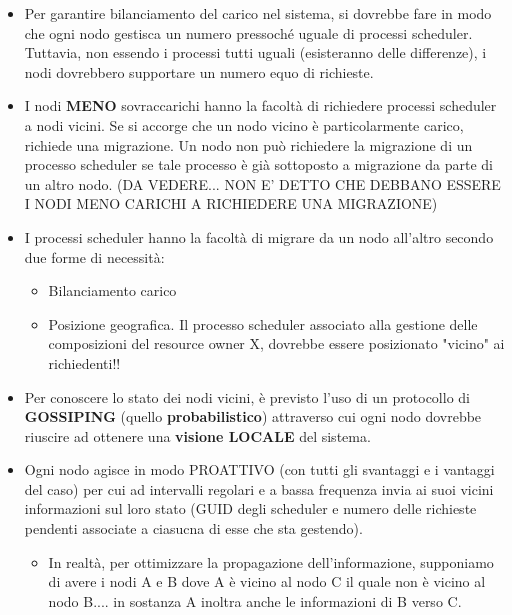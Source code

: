 \documentclass[10pt,a4paper]{report}
\begin{document}
\begin{itemize}
\item Per garantire bilanciamento del carico nel sistema, si dovrebbe fare in modo che ogni nodo gestisca un numero pressoché uguale di processi scheduler. Tuttavia, non essendo i processi tutti uguali (esisteranno delle differenze), i nodi dovrebbero supportare un numero equo di richieste.

\item I nodi \textbf{MENO} sovraccarichi hanno la facoltà di richiedere processi scheduler a nodi vicini. Se si accorge che un nodo vicino è particolarmente carico, richiede una migrazione. Un nodo non può richiedere la migrazione di un processo scheduler se tale processo è già sottoposto a migrazione da parte di un altro nodo. (DA VEDERE... NON E' DETTO CHE DEBBANO ESSERE I NODI MENO CARICHI A RICHIEDERE UNA MIGRAZIONE)

\item I processi scheduler hanno la facoltà di migrare da un nodo all'altro secondo due forme di necessità:
\begin{itemize}
\item Bilanciamento carico
\item Posizione geografica. Il processo scheduler associato alla gestione delle composizioni del resource owner X, dovrebbe essere posizionato "vicino" ai richiedenti!!
\end{itemize}

\item Per conoscere lo stato dei nodi vicini, è previsto l'uso di un protocollo di \textbf{GOSSIPING} (quello \textbf{probabilistico}) attraverso cui ogni nodo dovrebbe riuscire ad ottenere una \textbf{visione LOCALE} del sistema.

\item Ogni nodo agisce in modo PROATTIVO (con tutti gli svantaggi e i vantaggi del caso) per cui ad intervalli regolari e a bassa frequenza invia ai suoi vicini informazioni sul loro stato (GUID degli scheduler e numero delle richieste pendenti associate a ciasucna di esse che sta gestendo).

\begin{itemize}
\item In realtà, per ottimizzare la propagazione dell'informazione, supponiamo di avere i nodi A e B dove A è vicino al nodo C il quale non è vicino al nodo B.... in sostanza A inoltra anche le informazioni di B verso C.
\end{itemize}


\end{itemize}
\end{document}
